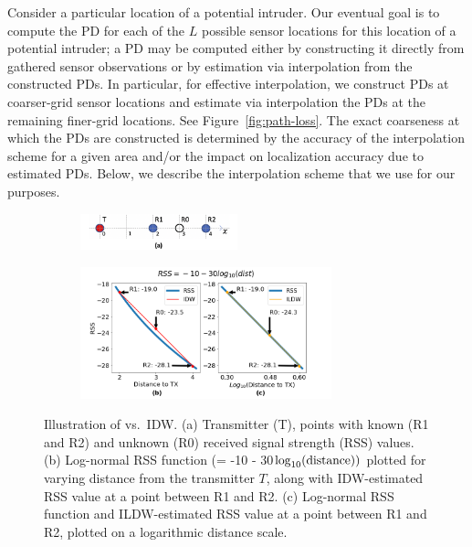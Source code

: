 Consider a particular
location \lstar of a potential intruder. Our eventual goal is to
compute the PD for each of the $L$ possible sensor locations for this
location \lstar of a potential intruder; a PD may be computed either
by constructing it directly from gathered sensor observations or by
estimation via interpolation from the constructed PDs. In particular,
for effective interpolation, we construct PDs at coarser-grid sensor
locations and estimate via interpolation the PDs at the remaining
finer-grid locations. See Figure~\ref{fig:path-loss}. The exact
coarseness at which the PDs are constructed is determined by the
accuracy of the interpolation scheme for a given area and/or the
impact on localization accuracy due to estimated PDs. Below, we
describe the interpolation scheme that we use for our purposes.


\begin{figure}
  \begin{subfigure}[t]{0.9\textwidth}
    \centering
    \includegraphics[width=0.5\textwidth]{chapters/ipsn/figures/interpolate.png}
  \end{subfigure}
  \qquad
  \newline
  \begin{subfigure}[t]{\textwidth}
    \centering
    \includegraphics[width=0.8\textwidth]{chapters/ipsn/figures/ildw.png}
  \end{subfigure}
  \caption{Illustration of \ildw vs.\ IDW.
  (a) Transmitter (T), points with known (R1 and R2) and unknown (R0) received signal strength (RSS) values.
  (b) Log-normal RSS function (= -10 - 30$\log_{10}({\rm distance}))$
  plotted for varying distance from the transmitter $T$, along
  with IDW-estimated RSS value at a point between R1 and R2.
  (c) Log-normal RSS function and ILDW-estimated RSS value at
  a point between R1 and R2, plotted on a logarithmic distance
  scale.}
  \label{fig:ildw}
\end{figure}

